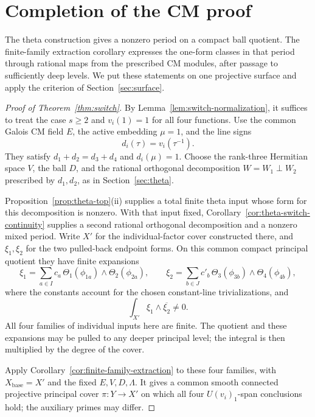 \section{Completion of the CM proof}\label{sec:assembly}

The theta construction gives a nonzero period on a compact ball
quotient.  The finite-family extraction corollary expresses the one-form
classes in that period through rational maps from the prescribed CM
modules, after passage to sufficiently deep levels.  We put these
statements on one projective surface and apply the criterion of
Section~\ref{sec:surface}.

\begin{proof}[Proof of Theorem~\ref{thm:switch}]
By Lemma~\ref{lem:switch-normalization}, it suffices to treat the case
\(s\geq2\) and \(v_i(1)=1\) for all four functions.  Use the common
Galois CM field \(E\), the active embedding \(\mu=1\), and the line
signs
\[
 d_i(\tau)=v_i(\tau^{-1}).
\]
They satisfy \(d_1+d_2=d_3+d_4\) and \(d_i(\mu)=1\).  Choose the
rank-three Hermitian space \(V\), the ball \(D\), and the rational
orthogonal decomposition \(W=W_1\perp W_2\) prescribed by \(d_1,d_2\),
as in Section~\ref{sec:theta}.

Proposition~\ref{prop:theta-top}(ii) supplies a total finite theta
input whose form for this decomposition is nonzero.  With that input
fixed, Corollary~\ref{cor:theta-switch-continuity} supplies a second
rational orthogonal decomposition and a nonzero mixed period.
Write \(X'\) for the individual-factor cover
constructed there, and \(\xi_1,\xi_2\) for the two pulled-back endpoint
forms.  On this common compact principal quotient they have finite expansions
\[
 \xi_1=\sum_{a\in I}c_a\,
       \Theta_1(\phi_{1a})\wedge\Theta_2(\phi_{2a}),
 \qquad
 \xi_2=\sum_{b\in J}c'_b\,
       \Theta_3(\phi_{3b})\wedge\Theta_4(\phi_{4b}),
\]
where the constants account for the chosen constant-line
trivializations, and
\[
 \int_{X'}\xi_1\wedge\overline{\xi_2}\ne0.
\]
All four families of individual inputs here are finite.  The quotient
and these expansions may be pulled to any deeper principal level;
the integral is then multiplied by the degree of the cover.

Apply Corollary~\ref{cor:finite-family-extraction} to these four families,
with \(X_{\mathrm{base}}=X'\) and the fixed \(E,V,D,\Lambda\).
It gives a common smooth connected projective principal cover
\(\pi:Y\to X'\) on which all four \(U(v_i)_1\)-span conclusions hold;
the auxiliary primes may differ.


\end{proof}
